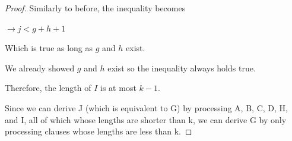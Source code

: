 \documentclass[manuscript]{acmart}
\begin{document}
\begin{proof}
        Similarly to before, the inequality becomes
        
        $\rightarrow j < g + h + 1$

        Which is true as long as $g$ and $h$ exist. 

        We already showed $g$ and $h$ exist so the inequality always 
        holds true.

        Therefore, the length of $I$ is at most $k - 1$.

        Since we can derive J (which is equivalent to G) by processing
        A, B, C, D, H, and I, all of which whose lengths are shorter than k, 
        we can derive G by only processing clauses whose lengths are 
        less than k.
        
    \end{proof}
\end{document}
